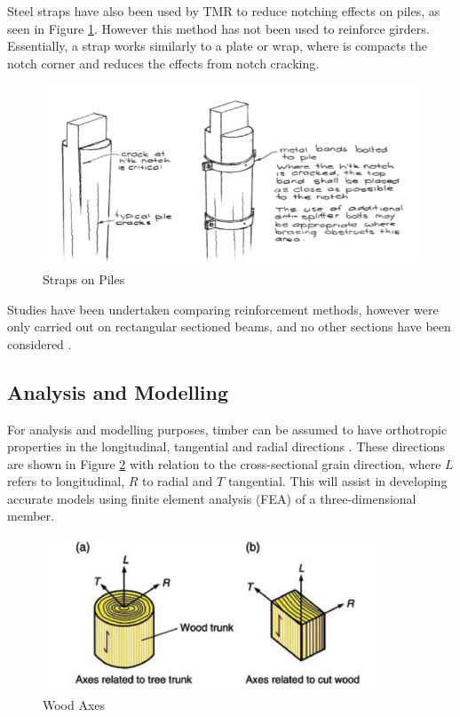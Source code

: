 \documentclass[11pt,a4paper]{article}
\numberwithin{equation}{subsection}
\begin{document}
\vspace*{\baselineskip}

\noindent
Steel straps have also been used by TMR to reduce notching effects on piles, as seen in Figure \ref{fig:External}. However this method has not been used to reinforce girders. Essentially, a strap works similarly to a plate or wrap, where is compacts the notch corner and reduces the effects from notch cracking. 

	\begin{figure}[h]
		\includegraphics[scale=0.6]{Piles}
		\caption{Straps on Piles \cite{_timber_2005}}
		\label{fig:External}
	\end{figure} 

\noindent
Studies have been undertaken comparing reinforcement methods, however were only carried out on rectangular sectioned beams, and no other sections have been considered  \cite{jockwer_structural_2014}.

\subsection{Analysis and Modelling}
For analysis and modelling purposes, timber can be assumed to have orthotropic properties in the longitudinal, tangential and radial directions \cite{kim_modeling_2010}. These directions are shown in Figure \ref{fig:Axes} with relation to the cross-sectional grain direction, where $L$ refers to longitudinal, $R$ to radial and $T$ tangential. This will assist in developing accurate models using finite element analysis (FEA) of a three-dimensional member. 

\begin{figure}[h]
	\begin{center}
		\includegraphics[scale=0.8]{Wood_Axes}
	\end{center}
 	\caption{Wood Axes \cite{porteous_structural_2013}}
 	\label{fig:Axes}
\end{figure}
\end{document}
